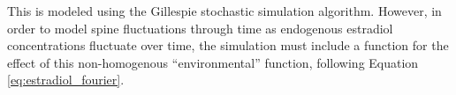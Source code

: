 \documentclass[11pt,letterpaper, onecolumn]{exam}
\begin{document}
This is modeled using the Gillespie stochastic simulation algorithm. However, in order to model spine fluctuations through time as endogenous estradiol concentrations fluctuate over time, the simulation must include a function for the effect of this non-homogenous ``environmental'' function, following Equation \eqref{eq:estradiol_fourier}.



\end{document}

